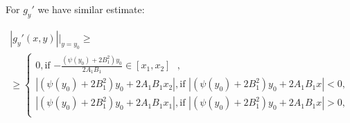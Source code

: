 \documentclass[12pt]{article}
\begin{document}
For $g_y'$ we have similar estimate:

\begin{eqnarray}
|g_y'(x,y)|\Big|_{y=y_0} \geq\nonumber\\ 
\geq \begin{cases}
0, \text{if $-\frac{(\psi(y_0) + 2B_1^2)y_0}{2A_1B_1}\in [x_1, x_2]$ },\\
|(\psi(y_0) + 2B_1^2)y_0 + 2A_1B_1x_2|, \text{if $|(\psi(y_0) + 2B_1^2)y_0 + 2A_1B_1x|<0$},\\ 
|(\psi(y_0) + 2B_1^2)y_0 + 2A_1B_1x_1|, \text{if $|(\psi(y_0) + 2B_1^2)y_0 + 2A_1B_1x|>0$},\\
\end{cases}
\end{eqnarray}
\end{document}
